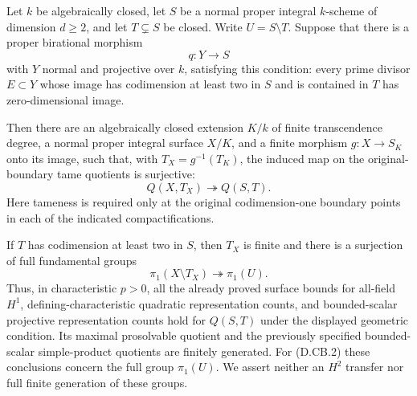 \begin{theorem}
\label{D:generic-surface-controlled-boundary}
Let $k$ be algebraically closed, let $S$ be a normal proper integral
$k$-scheme of dimension $d\ge2$, and let $T\subsetneq S$ be closed.
Write $U=S\setminus T$. Suppose that there is a proper birational
morphism
\[
                      q:Y\longrightarrow S
\]
with $Y$ normal and projective over $k$, satisfying this condition:
every prime divisor $E\subset Y$ whose image has codimension at least
two in $S$ and is contained in $T$ has zero-dimensional image.

Then there are an algebraically closed extension $K/k$ of finite
transcendence degree, a normal proper integral surface $X/K$, and a
finite morphism $g:X\to S_K$ onto its image, such that, with
$T_X=g^{-1}(T_K)$, the induced map on the original-boundary tame
quotients is surjective:
\[
                 Q(X,T_X)\twoheadrightarrow Q(S,T).
                 \tag{D.CB.1}
\]
Here tameness is required only at the original codimension-one boundary
points in each of the indicated compactifications.

If $T$ has codimension at least two in $S$, then $T_X$ is finite and
there is a surjection of full fundamental groups
\[
                 \pi_1(X\setminus T_X)\twoheadrightarrow\pi_1(U).
                 \tag{D.CB.2}
\]
Thus, in characteristic $p>0$, all the already proved surface bounds
for all-field $H^1$, defining-characteristic quadratic representation
counts, and bounded-scalar projective representation counts hold for
$Q(S,T)$ under the displayed geometric condition. Its maximal
prosolvable quotient and the previously specified bounded-scalar
simple-product quotients are finitely generated. For (D.CB.2) these
conclusions concern the full group $\pi_1(U)$. We assert neither an
$H^2$ transfer nor full finite generation of these groups.
\end{theorem}

